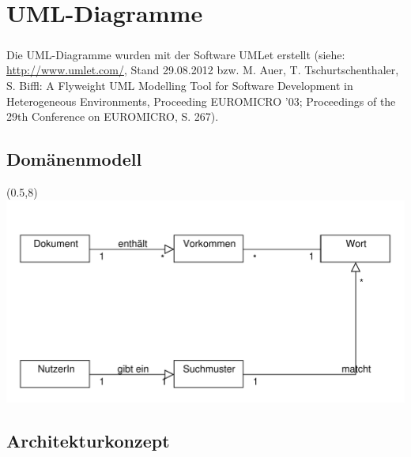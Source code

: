 
\chapter{UML-Diagramme}

\paragraph{} Die UML-Diagramme wurden mit der Software UMLet erstellt (siehe: \url{http://www.umlet.com/}, Stand 29.08.2012 bzw. M. Auer, T. Tschurtschenthaler, S. Biffl: A Flyweight UML Modelling Tool for Software Development in Heterogeneous Environments, Proceeding EUROMICRO '03; Proceedings of the 29th Conference on EUROMICRO, S. 267).

\section{Domänenmodell}
\label{uml-domain}

\begin{textblock}{3}(0.5,8)
\includegraphics[scale=1]{resources/domain-model.pdf}
\end{textblock}
\newpage

\section{Architekturkonzept}
\label{uml-architecture}

